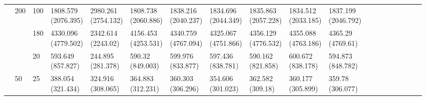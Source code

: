 \documentclass[12pt,a4paper]{article}
\begin{document}
\begin{landscape}
\begin{longtable}{lllllllllllrrrrrrrr}
 & \multirow[t]{3}{*}{200} & 100 & \makecell{1808.579 \\ (2076.395)} & \makecell{2980.261 \\ (2754.132)} & \makecell{1808.738 \\ (2060.886)} & \makecell{1838.216 \\ (2040.237)} & \makecell{1834.696 \\ (2044.349)} & \makecell{1835.863 \\ (2057.228)} & \makecell{1834.512 \\ (2033.185)} & \makecell{1837.199 \\ (2046.792)} \\
 &  & 180 & \makecell{4330.096 \\ (4779.502)} & \makecell{2342.614 \\ (2243.02)} & \makecell{4156.453 \\ (4253.531)} & \makecell{4340.759 \\ (4767.094)} & \makecell{4325.067 \\ (4751.866)} & \makecell{4356.129 \\ (4776.532)} & \makecell{4355.088 \\ (4763.186)} & \makecell{4365.29 \\ (4769.61)} \\
 &  & 20 & \makecell{593.649 \\ (857.827)} & \makecell{244.895 \\ (281.378)} & \makecell{590.32 \\ (849.003)} & \makecell{599.976 \\ (833.877)} & \makecell{597.436 \\ (838.781)} & \makecell{590.162 \\ (821.858)} & \makecell{600.672 \\ (838.178)} & \makecell{594.873 \\ (848.782)} \\
\cline{2-19}
 & \multirow[t]{3}{*}{50} & 25 & \makecell{388.054 \\ (321.434)} & \makecell{324.916 \\ (308.065)} & \makecell{364.883 \\ (312.231)} & \makecell{360.303 \\ (306.296)} & \makecell{354.606 \\ (301.023)} & \makecell{362.582 \\ (309.18)} & \makecell{360.177 \\ (305.899)} & \makecell{359.78 \\ (306.077)} \\

\end{longtable}
\end{landscape}
\end{document}
